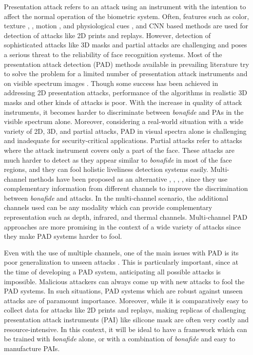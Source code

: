 \documentclass[journal]{IEEEtran}
\begin{document}
Presentation attack refers to an attack using an instrument with the intention to affect the normal operation of the biometric system. Often, features such as color, texture \cite{boulkenafet2015face}, \cite{maatta2011face}, motion \cite{anjos2011counter}, and physiological cues \cite{ramachandra2017presentation}, \cite{heusch2019remote} and CNN based methods \cite{george2019deep} are used for detection of attacks like 2D prints and replays. However, detection of sophisticated attacks like 3D masks and partial attacks are challenging and poses a serious threat to the reliability of face recognition systems. Most of the presentation attack detection (PAD) methods available in prevailing literature try to solve the problem for a limited number of presentation attack instruments and on visible spectrum images \cite{handbook2}. Though some success has been achieved in addressing 2D presentation attacks, performance of the algorithms in realistic 3D masks and other kinds of attacks is poor. With the increase in quality of attack instruments, it becomes harder to discriminate between \textit{bonafide} and PAs in the visible spectrum alone.  Moreover, considering a real-world situation with a wide variety of 2D, 3D, and partial attacks, PAD in visual spectra alone is challenging and inadequate for security-critical applications. Partial attacks refer to attacks where the attack instrument covers only a part of the face. These attacks are much harder to detect as they appear similar to \textit{bonafide} in most of the face regions, and they can fool holistic liveliness detection systems easily. Multi-channel methods have been proposed as an alternative \cite{raghavendra2017extended}, \cite{steiner2016reliable}, \cite{bhattacharjee2017you}, \cite{george_mccnn_tifs2019,george2020face,heusch2020deep,george2020face,nikisins2019domain}, since they use complementary information from different channels to improve the discrimination between \textit{bonafide} and attacks. In the multi-channel scenario, the additional channels used can be any modality which can provide complementary representation such as depth, infrared, and thermal channels. Multi-channel PAD approaches are more promising in the context of a wide variety of attacks since they make PAD systems harder to fool.



Even with the use of multiple channels, one of the main issues with PAD is its poor generalization to unseen attacks \cite{george_mccnn_tifs2019}. This is particularly important, since at the time of developing a PAD system, anticipating all possible attacks is impossible. Malicious attackers can always come up with new attacks to fool the PAD systems. In such situations, PAD systems which are robust against unseen attacks are of paramount importance. Moreover, while it is comparatively easy to collect data for attacks like 2D prints and replays, making replicas of challenging presentation attack instruments (PAI) like silicone mask are often very costly \cite{Bhattacharjee:256262} and resource-intensive. In this context, it will be ideal to have a framework which can be trained with \textit{bonafide} alone, or with a combination of \textit{bonafide} and easy to manufacture PAIs.
\end{document}
